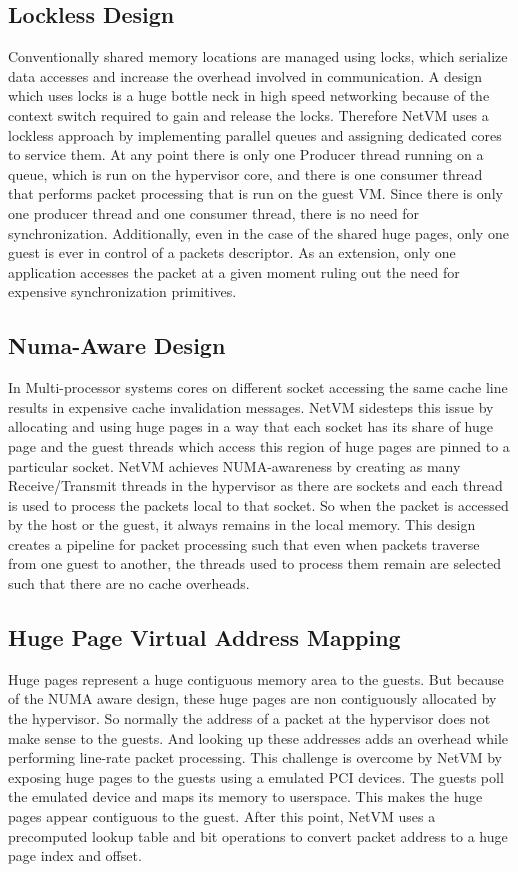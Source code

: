 \subsection*{Lockless Design}
Conventionally shared memory locations are managed using locks, which serialize data accesses and increase the overhead involved in communication. A design which uses locks is a huge bottle neck in high speed networking because of the context switch required to gain and release the locks. Therefore NetVM uses a lockless approach by implementing parallel queues and assigning dedicated cores to service them. At any point there is only one Producer thread running on a queue, which is run on the hypervisor core, and there is one consumer thread that performs packet processing that is run on the guest VM. Since there is only one producer thread and one consumer thread, there is no need for synchronization. Additionally, even in the case of the shared huge pages, only one guest is ever in control of a packets descriptor. As an extension, only one application accesses the packet at a given moment ruling out the need for expensive synchronization primitives.
\subsection*{Numa-Aware Design}
In Multi-processor systems cores on different socket accessing the same cache line results in expensive cache invalidation messages. NetVM sidesteps this issue by allocating and using huge pages in a way that each socket has its share of huge page and the guest threads which access this region of huge pages are pinned to a particular socket. NetVM achieves NUMA-awareness by creating as many Receive/Transmit threads in the hypervisor as there are sockets and each thread is used to process the packets local to that socket. So when the packet is accessed by the host or the guest, it always remains in the local memory. This design creates a pipeline for packet processing such that even when packets traverse from one guest to another, the threads used to process them remain are selected such that there are no cache overheads.
\subsection*{Huge Page Virtual Address Mapping}
Huge pages represent a huge contiguous memory area to the guests. But because of the NUMA aware design, these huge pages are non contiguously allocated by the hypervisor. So normally the address of a packet at the hypervisor does not make sense to the guests. And looking up these addresses adds an overhead while performing line-rate packet processing. This challenge is overcome by NetVM by exposing huge pages to the guests using a emulated PCI devices. The guests poll the emulated device and maps its memory to userspace. This makes the huge pages appear contiguous to the guest. After this point, NetVM uses a precomputed lookup table and bit operations to convert packet address to a huge page index and offset.
